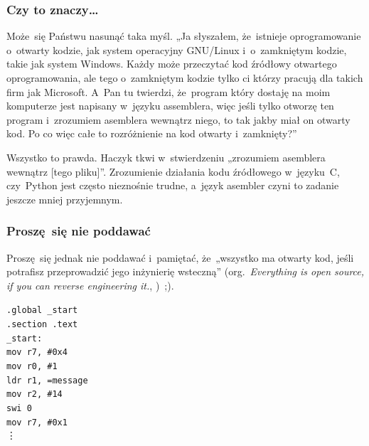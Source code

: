 \documentclass[10pt,t]{beamer}
\begin{document}
\begin{frame}
  \frametitle{Czy to znaczy\ldots}


  Może~się Państwu nasunąć taka myśl. „Ja słyszałem, że~istnieje
  oprogramowanie o~otwarty kodzie, jak system operacyjny GNU/Linux
  i~o~zamkniętym kodzie, takie jak system Windows. Każdy może przeczytać
  kod źródłowy otwartego oprogramowania,
  ale tego o~zamkniętym kodzie tylko ci którzy pracują dla takich firm jak
  Microsoft. A~Pan tu twierdzi, że~program który dostaję na moim komputerze
  jest napisany w~języku assemblera, więc jeśli tylko otworzę ten program
  i~zrozumiem asemblera wewnątrz niego, to tak jakby miał on otwarty kod.
  Po co więc całe to rozróżnienie na kod otwarty i~zamknięty?”

  Wszystko to prawda. Haczyk tkwi w~stwierdzeniu \alert{„zrozumiem asemblera
    wewnątrz [tego pliku]”}. Zrozumienie działania kodu źródłowego
  w~języku~C, czy~Python jest często nieznośnie trudne, a~język asembler
  czyni to zadanie jeszcze mniej przyjemnym.

\end{frame}





\begin{frame}
  \frametitle{Proszę~się nie poddawać}


  Proszę~się jednak nie poddawać i~pamiętać, że~„wszystko ma otwarty
  kod, jeśli potrafisz przeprowadzić jego inżynierię wsteczną”
  (org.~\textit{Everything is open source, if you can reverse engineering
    it.},
  \parencite{Low-Level-Everything-is-open-source-if-ETC-Ver-2023})~;).

  \vspace{1.5em}





  \texttt{.global \_start} \\
  \texttt{.section .text} \\



  \texttt{\_start:} \\[-0.2em]
  \hphantom{aaaaaaaa} \texttt{mov r7, \#0x4} \\
  \hphantom{aaaaaaaa} \texttt{mov r0, \#1} \\
  \hphantom{aaaaaaaa} \texttt{ldr r1, =message} \\
  \hphantom{aaaaaaaa} \texttt{mov r2, \#14} \\

  \hphantom{aaaaaaaa} \texttt{swi 0} \\

  \hphantom{aaaaaaaa} \texttt{mov r7, \#0x1} \\
  \hspace{5em} \vdots

\end{frame}
\end{document}
